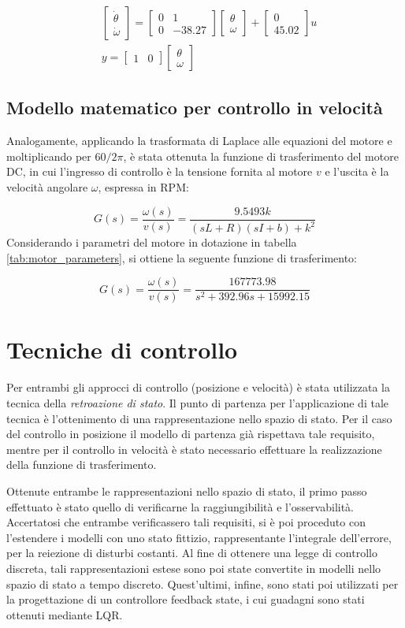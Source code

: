 \documentclass[11pt,a4paper,oneside]{extarticle}
\newcommand\mtrx[1]{
    \begin{bmatrix}
        #1
    \end{bmatrix}
}
\begin{document}
\begin{equation}
	\begin{split}
		&\mtrx{\dot{\theta}\\ \dot{\omega}}= \mtrx{0 & 1\\ 0 & -38.27}\mtrx{\theta\\ \omega} + \mtrx{0\\ 45.02}u\\
		&y = \mtrx{1 & 0}\mtrx{\theta\\ \omega}
	\end{split}
\end{equation}

\subsection{Modello matematico per controllo in velocità}
Analogamente, applicando la trasformata di Laplace alle equazioni del motore e moltiplicando per $60/2\pi$, è stata ottenuta la funzione di trasferimento del motore DC, in cui l'ingresso di controllo è la tensione fornita al motore $v$ e l'uscita è la velocità angolare $\omega$, espressa in RPM:

\begin{equation}
	G(s) = \frac{\omega(s)}{v(s)} = \frac{9.5493k}{(sL + R)(sI + b) + k^2}
\end{equation}
Considerando i parametri del motore in dotazione in tabella \ref{tab:motor_parameters}, si ottiene la seguente funzione di trasferimento:

\begin{equation}
	G(s) = \frac{\omega(s)}{v(s)} = \frac{167773.98}{s^2 + 392.96s + 15992.15}
\end{equation}

\section{Tecniche di controllo}
Per entrambi gli approcci di controllo (posizione e velocità) è stata utilizzata la tecnica della \textit{retroazione di stato}. Il punto di partenza per l'applicazione di tale tecnica è l'ottenimento di una rappresentazione nello spazio di stato. Per il caso del controllo in posizione il modello di partenza già rispettava tale requisito, mentre per il controllo in velocità è stato necessario effettuare la realizzazione della funzione di trasferimento.\bigskip

Ottenute entrambe le rappresentazioni nello spazio di stato, il primo passo effettuato è stato quello di verificarne la raggiungibilità e l'osservabilità. Accertatosi che entrambe verificassero tali requisiti, si è poi proceduto con l'estendere i modelli con uno stato fittizio, rappresentante l'integrale dell'errore, per la reiezione di disturbi costanti. Al fine di ottenere una legge di controllo discreta, tali rappresentazioni estese sono poi state convertite in modelli nello spazio di stato a tempo discreto. Quest'ultimi, infine, sono stati poi utilizzati per la progettazione di un controllore feedback state, i cui guadagni sono stati ottenuti mediante LQR.\bigskip
\end{document}
